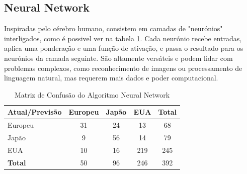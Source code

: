 \documentclass[conference]{IEEEtran}
\begin{document}
\subsection{Neural Network}
Inspiradas pelo cérebro humano, consistem em camadas de "neurónios" interligados, como é possivel ver na tabela \ref{tab:conf_matrix_neural}.
Cada neurónio recebe entradas, aplica uma ponderação e uma função de ativação, e passa o resultado para os neurónios da camada seguinte.
São altamente versáteis e podem lidar com problemas complexos, como reconhecimento de imagens ou processamento de linguagem natural,
mas requerem mais dados e poder computacional.
\begin{table}[!ht]
	\centering
	\begin{tabular}{lcccc}
		\toprule
		\textbf{Atual/Previsão} & \textbf{Europeu} & \textbf{Japão} & \textbf{EUA} & \textbf{Total} \\
		\midrule
		Europeu                 & 31               & 24             & 13           & 68             \\
		Japão                   & 9                & 56             & 14           & 79             \\
		EUA                     & 10               & 16             & 219          & 245            \\
		\midrule
		\textbf{Total}          & 50               & 96             & 246          & 392            \\
		\bottomrule
	\end{tabular}
	\label{tab:conf_matrix_neural}
	\caption{Matriz de Confusão do Algoritmo Neural Network}
\end{table}

\end{document}
